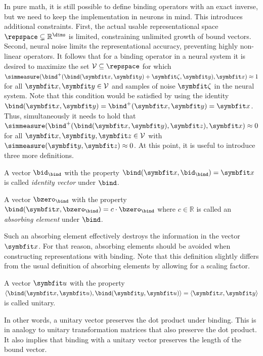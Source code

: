 In pure math, it is still possible to define binding operators with an exact inverse, but we need to keep the implementation in neurons in mind.
This introduces additional constraints.
First, the actual usable representational space $\repspace \subsetneq \mathbb{R}^{\dims}$ is limited, constraining unlimited growth of bound vectors.
Second, neural noise limits the representational accuracy, preventing highly non-linear operators.
It follows that for a binding operator in a neural system it is desired to maximize the set $\mathcal{V} \subseteq \repspace$ for which  $\simmeasure(\bind^+(\bind(\vc x, \vc y) + \vc\zeta, \vc y), \vc x) \approx 1$ for all $\vc x, \vc y \in \mathcal{V}$ and samples of noise $\vc\zeta$ in the neural system.
Note that this condition would be satisfied by using the identity $\bind(\vc x, \vc y) = \bind^+(\vc x, \vc y) = \vc x$.
Thus, simultaneously it needs to hold that $\simmeasure(\bind^+(\bind(\vc x, \vc y), \vc z), \vc x) \approx 0$ for all $\vc x, \vc y, \vc z \in \mathcal{V}$ with $\simmeasure(\vc y, \vc z) \approx 0$.
At this point, it is useful to introduce three more definitions.

\begin{defn}
    A vector $\bid_{\bind}$ with the property $\bind(\vc x, \bid_{\bind}) = \vc x$ is called \emph{identity vector} under $\bind$.
\end{defn}
\begin{defn}
    A vector $\bzero_{\bind}$ with the property $\bind(\vc x, \bzero_{\bind}) = c \cdot \bzero_{\bind}$ where $c \in \mathbb{R}$ is called an \emph{absorbing element} under $\bind$.
\end{defn}
Such an absorbing element effectively destroys the information in the vector $\vc x$.
For that reason, absorbing elements should be avoided when constructing representations with binding.
Note that this definition slightly differs from the usual definition of absorbing elements by allowing for a scaling factor.
\begin{defn}
    A vector $\vc u$ with the property $\langle \bind(\vc x, \vc u), \bind(\vc y, \vc u) \rangle = \langle \vc x, \vc y \rangle$ is called unitary.
\end{defn}
In other words, a unitary vector preserves the dot product under binding.
This is in analogy to unitary transformation matrices that also preserve the dot product.
It also implies that binding with a unitary vector preserves the length of the bound vector.


